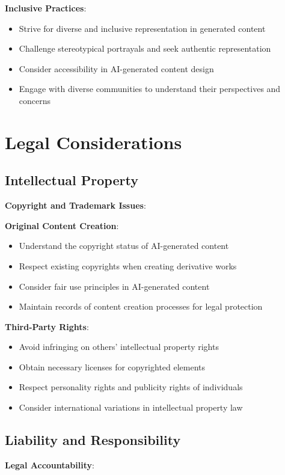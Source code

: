 \textbf{Inclusive Practices}:
\begin{itemize}
\item Strive for diverse and inclusive representation in generated content
\item Challenge stereotypical portrayals and seek authentic representation
\item Consider accessibility in AI-generated content design
\item Engage with diverse communities to understand their perspectives and concerns
\end{itemize}

\section{Legal Considerations}

\subsection{Intellectual Property}
\textbf{Copyright and Trademark Issues}:

\textbf{Original Content Creation}:
\begin{itemize}
\item Understand the copyright status of AI-generated content
\item Respect existing copyrights when creating derivative works
\item Consider fair use principles in AI-generated content
\item Maintain records of content creation processes for legal protection
\end{itemize}

\textbf{Third-Party Rights}:
\begin{itemize}
\item Avoid infringing on others' intellectual property rights
\item Obtain necessary licenses for copyrighted elements
\item Respect personality rights and publicity rights of individuals
\item Consider international variations in intellectual property law
\end{itemize}

\subsection{Liability and Responsibility}
\textbf{Legal Accountability}:

